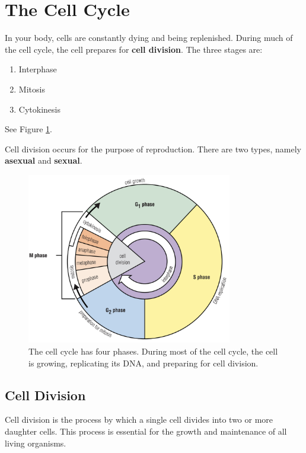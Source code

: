 \documentclass[12pt]{report}
\begin{document}
\section{The Cell Cycle}
\begin{definition}
In your body, cells are constantly dying and being replenished. During much of the cell cycle, the cell prepares for \textbf{cell division}. The three stages are: 
\begin{enumerate}
\setlength\itemsep{0.5em}
    \item{Interphase}
    \item{Mitosis}
    \item{Cytokinesis}
\end{enumerate}
See Figure \ref{fig:cell-cycle}.
\end{definition}

Cell division occurs for the purpose of reproduction. There are two types, namely \textbf{asexual} and \textbf{sexual}.

\begin{figure}[H]
\centering
    \includegraphics[width=0.8\textwidth]{../figures/cell cycle.png}
    \caption{The cell cycle has four phases. During most of the cell cycle, the cell is growing, replicating its DNA, and preparing for cell division.}
    \label{fig:cell-cycle}
\end{figure}

\subsection{Cell Division}
\begin{definition}
    Cell division is the process by which a single cell divides into two or more daughter cells. This process is essential for the growth and maintenance of all living organisms.
\end{definition}
\end{document}
